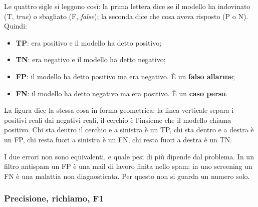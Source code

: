 \documentclass[12pt]{extarticle}
\begin{document}
\noindent Le quattro sigle si leggono così: la prima lettera dice se il modello ha indovinato (T, \emph{true}) o sbagliato (F, \emph{false}); la seconda dice che cosa aveva risposto (P o N). Quindi:
\begin{itemize}
    \item \textbf{TP}: era positivo e il modello ha detto positivo;
    \item \textbf{TN}: era negativo e il modello ha detto negativo;
    \item \textbf{FP}: il modello ha detto positivo ma era negativo. È un \textbf{falso allarme};
    \item \textbf{FN}: il modello ha detto negativo ma era positivo. È un \textbf{caso perso}.
\end{itemize}

\begin{center}
\end{center}

\noindent La figura dice la stessa cosa in forma geometrica: la linea verticale separa i positivi reali dai negativi reali, il cerchio è l'insieme che il modello chiama positivo. Chi sta dentro il cerchio e a sinistra è un TP, chi sta dentro e a destra è un FP, chi resta fuori a sinistra è un FN, chi resta fuori a destra è un TN.

\noindent I due errori non sono equivalenti, e quale pesi di più dipende dal problema. In un filtro antispam un FP è una mail di lavoro finita nello spam; in uno screening un FN è una malattia non diagnosticata. Per questo non si guarda un numero solo.

\subsubsection{Precisione, richiamo, F1}
\end{document}
